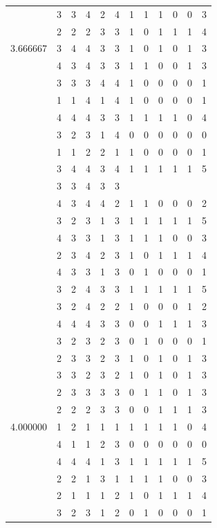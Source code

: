 \documentclass[]{book}
\theoremstyle{definition}
\theoremstyle{definition}
\theoremstyle{definition}
\theoremstyle{remark}
\begin{document}
\begin{table}
{\begin{tabular}[t]{rrrrrrrrrrrr}
 & 3 & 3 & 4 & 2 & 4 & 1 & 1 & 1 & 0 & 0 & 3\\
 & 2 & 2 & 2 & 3 & 3 & 1 & 0 & 1 & 1 & 1 & 4\\
3.666667 & 3 & 4 & 4 & 3 & 3 & 1 & 0 & 1 & 0 & 1 & 3\\
 & 4 & 3 & 4 & 3 & 3 & 1 & 1 & 0 & 0 & 1 & 3\\
 & 3 & 3 & 3 & 4 & 4 & 1 & 0 & 0 & 0 & 0 & 1\\
 & 1 & 1 & 4 & 1 & 4 & 1 & 0 & 0 & 0 & 0 & 1\\
 & 4 & 4 & 4 & 3 & 3 & 1 & 1 & 1 & 1 & 0 & 4\\
 & 3 & 2 & 3 & 1 & 4 & 0 & 0 & 0 & 0 & 0 & 0\\
 & 1 & 1 & 2 & 2 & 1 & 1 & 0 & 0 & 0 & 0 & 1\\
 & 3 & 4 & 4 & 3 & 4 & 1 & 1 & 1 & 1 & 1 & 5\\
 & 3 & 3 & 4 & 3 & 3 &  &  &  &  &  & \\
 & 4 & 3 & 4 & 4 & 2 & 1 & 1 & 0 & 0 & 0 & 2\\
 & 3 & 2 & 3 & 1 & 3 & 1 & 1 & 1 & 1 & 1 & 5\\
 & 4 & 3 & 3 & 1 & 3 & 1 & 1 & 1 & 0 & 0 & 3\\
 & 2 & 3 & 4 & 2 & 3 & 1 & 0 & 1 & 1 & 1 & 4\\
 & 4 & 3 & 3 & 1 & 3 & 0 & 1 & 0 & 0 & 0 & 1\\
 & 3 & 2 & 4 & 3 & 3 & 1 & 1 & 1 & 1 & 1 & 5\\
 & 3 & 2 & 4 & 2 & 2 & 1 & 0 & 0 & 0 & 1 & 2\\
 & 4 & 4 & 4 & 3 & 3 & 0 & 0 & 1 & 1 & 1 & 3\\
 & 3 & 2 & 3 & 2 & 3 & 0 & 1 & 0 & 0 & 0 & 1\\
 & 2 & 3 & 3 & 2 & 3 & 1 & 0 & 1 & 0 & 1 & 3\\
 & 3 & 3 & 2 & 3 & 2 & 1 & 0 & 1 & 0 & 1 & 3\\
 & 2 & 3 & 3 & 3 & 3 & 0 & 1 & 1 & 0 & 1 & 3\\
 & 2 & 2 & 2 & 3 & 3 & 0 & 0 & 1 & 1 & 1 & 3\\
4.000000 & 1 & 2 & 1 & 1 & 1 & 1 & 1 & 1 & 1 & 0 & 4\\
 & 4 & 1 & 1 & 2 & 3 & 0 & 0 & 0 & 0 & 0 & 0\\
 & 4 & 4 & 4 & 1 & 3 & 1 & 1 & 1 & 1 & 1 & 5\\
 & 2 & 2 & 1 & 3 & 1 & 1 & 1 & 1 & 0 & 0 & 3\\
 & 2 & 1 & 1 & 1 & 2 & 1 & 0 & 1 & 1 & 1 & 4\\
 & 3 & 2 & 3 & 1 & 2 & 0 & 1 & 0 & 0 & 0 & 1\\

\end{tabular}}
\end{table}
\end{document}
